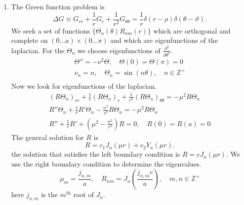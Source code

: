 {\begin{Solution}
\begin{enumerate}
\begin{multline*}
      \sin \left( \frac{m \pi y}{H} \right)
      \sin \left( \frac{n \pi z}{W} \right)
    \end{multline*}
    We equate terms and solve for the coefficients $g_{k m n}$.
    \[
    g_{k m n} = - \frac{ \sqrt{ \frac{8}{L H W} }\,
      \sin \left( \frac{k \pi \xi}{L} \right)
      \sin \left( \frac{m \pi \psi}{H} \right)
      \sin \left( \frac{n \pi \zeta}{W} \right) }
    { \pi^2 \left( \left( \frac{k}{L} \right)^2 
        + \left( \frac{m}{H} \right)^2
        + \left( \frac{n}{W} \right)^2 \right) }
    \]
    This determines the Green function.
  \item
    The Green function problem is 
    \[
    \Delta G \equiv G_{r r} + \frac{1}{r} G_r 
    + \frac{1}{r^2} G_{\theta \theta} 
    = \frac{1}{r} \delta(r - \rho) \delta(\theta - \vartheta).
    \]
    We seek a set of functions $\{ \Theta_n(\theta) R_{n m}(r) \}$ which
    are orthogonal and complete on $(0 \ldots a) \times (0 \ldots \pi)$
    and which are eigenfunctions of the laplacian.  For the $\Theta_n$
    we choose eigenfunctions of $\frac{\partial^2}{\partial \theta^2}$.
    \begin{gather*}
      \Theta'' = - \nu^2 \Theta, \quad \Theta(0) = \Theta(\pi) = 0 \\
      \nu_n = n, \quad \Theta_n = \sin(n \theta), \quad n \in \mathbb{Z}^+ \\
    \end{gather*}
    Now we look for eigenfunctions of the laplacian.
    \begin{gather*}
      (R \Theta_n)_{r r} + \frac{1}{r} (R \Theta_n)_r 
      + \frac{1}{r^2} (R \Theta_n)_{\theta \theta} 
      = - \mu^2 R \Theta_n \\
      R'' \Theta_n + \frac{1}{r} R' \Theta_n 
      - \frac{n^2}{r^2} R \Theta_n = - \mu^2 R \Theta_n \\
      R'' + \frac{1}{r} R' + \left( \mu^2 - \frac{n^2}{r^2} \right) R = 0,
      \quad R(0) = R(a) = 0
    \end{gather*}
    The general solution for $R$ is
    \[
    R = c_1 J_n(\mu r) + c_2 Y_n(\mu r).
    \]
    the solution that satisfies the left boundary condition is
    $R = c J_n(\mu r)$.  We use the right boundary condition to 
    determine the eigenvalues.
    \[
    \mu_m = \frac{j_{n,m}}{a}, \quad
    R_{n m} = J_n \left( \frac{j_{n,m} r}{a} \right), \quad
    m,n \in \mathbb{Z}^+
    \]
    here $j_{n,m}$ is the $m^{\mathrm{th}}$ root of $J_n$.


\end{enumerate}
\end{Solution}}
